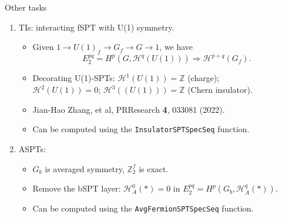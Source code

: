 \documentclass[xcolor=table, 11pt, aspectratio=169]{beamer}
\begin{document}
\begin{frame}{Other tasks}
	\begin{enumerate}
		\item TIs: interacting fSPT with U(1) symmetry.
		\begin{itemize}
			\item Given $1\rightarrow U(1)_f\rightarrow G_f\rightarrow G\rightarrow 1$, we have
			\[E_2^{pq}=H^p(G, \mathcal H^q(U(1)))\Rightarrow \mathcal H^{p+q}(G_f).\]
      \item Decorating U(1)-SPTs: $\mathcal H^1(U(1))=\mathbb Z$ (charge);\\ $\mathcal H^2(U(1))=0$;
        $\mathcal H^3((U(1)))=\mathbb Z$ (Chern insulator).
			\item Jian-Hao Zhang, et al, PRResearch \textbf{4}, 033081 (2022).
			\item Can be computed using the \lstinline|InsulatorSPTSpecSeq| function.
		\end{itemize}

		\item ASPTs:
		\begin{itemize}
			\item $G_b$ is averaged symmetry, $\mathbb Z_2^f$ is exact.
			\item Remove the bSPT layer: $\mathcal H^0_A(*)=0$ in $E_2^{pq}=H^p(G_b, \mathcal H^q_A(*))$.
			\item Can be computed using the \lstinline|AvgFermionSPTSpecSeq| function.
		\end{itemize}
	\end{enumerate}
\end{frame}

\end{document}
